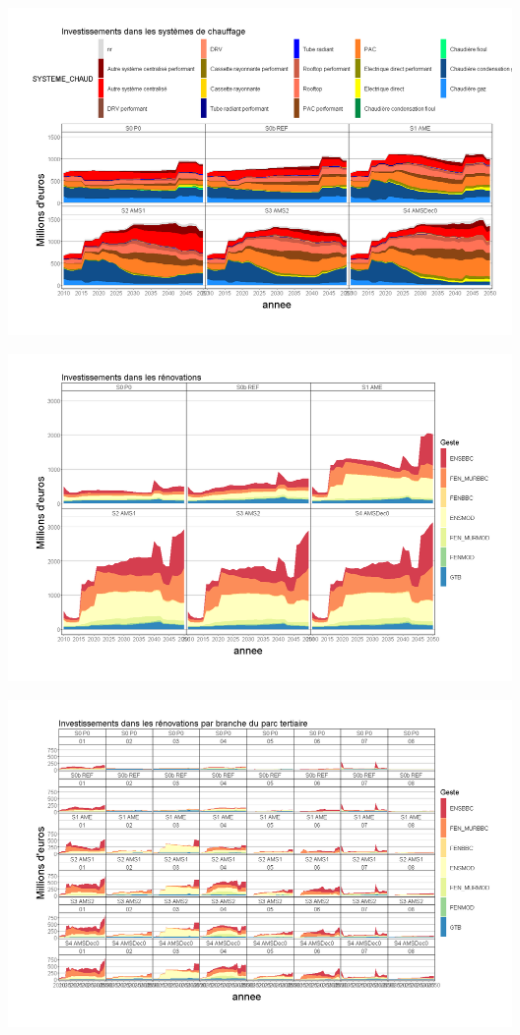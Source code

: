 \documentclass[]{article}
\begin{document}
\includegraphics{Exemple_sortiestertiaire_files/figure-latex/INV_syst-1.png}

\includegraphics{Exemple_sortiestertiaire_files/figure-latex/INV_Gestes-1.png}

\includegraphics{Exemple_sortiestertiaire_files/figure-latex/INV_geste_branche-1.png}
\end{document}
